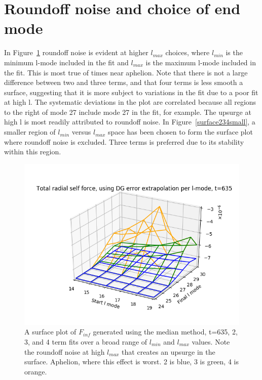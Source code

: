 \section{Roundoff noise and choice of end mode}

In Figure~\ref{surface234big} roundoff noise is evident at higher $l_{max}$ choices, where $l_{min}$ is the minimum l-mode included in the fit and $l_{max}$ is the maximum l-mode included in the fit. This is most true of times near aphelion. Note that there is not a large difference between two and three terms, and that four terms is less smooth a surface, suggesting that it is more subject to variations in the fit due to a poor fit at high l. The systematic deviations in the plot are correlated because all regions to the right of mode 27 include mode 27 in the fit, for example. The upsurge at high l is most readily attributed to roundoff noise. In Figure~\ref{surface234small}, a smaller region of $l_{min}$ versus $l_{max}$ space has been chosen to form the surface plot where roundoff noise is excluded. Three terms is preferred due to its stability within this region.

\begin{figure}
  \includegraphics{bestfinflminlmax234terms635fullrange_perihelion}
  \caption{A surface plot of $F_{inf}$ generated using the median method, t=635, 2, 3, and 4 term fits over a broad range of $l_{min}$ and $l_{max}$ values. Note the roundoff noise at high $l_{max}$ that creates an upsurge in the surface. Aphelion, where this effect is worst. 2 is blue, 3 is green, 4 is orange.}
  \label{surface234big}
\end{figure}

